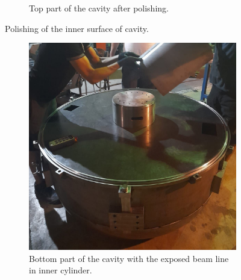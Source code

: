\documentclass{book}
\begin{document}
\begin{figure}
\begin{subfigure}{.5\textwidth}
      \caption{Top part of the cavity after polishing.}
    \end{subfigure}
    \caption{Polishing of the inner surface of cavity.}
    \label{fig:manif_polishing}
\end{figure}


\begin{figure}
    \captionsetup[subfigure]{justification=centering}
    \captionsetup{justification=centering}
    \centering
    \begin{subfigure}{.5\textwidth}
      \centering
      \includegraphics[width=.96\linewidth]{../../../figures/manif/toroidal_sheets/rhodo_bottom_cropped.jpeg}
      \caption{Bottom part of the cavity with the exposed beam line in inner cylinder.}
    \end{subfigure}%
    \centering
    \begin{subfigure}{.5\textwidth}
      \centering

\end{subfigure}
\end{figure}
\end{document}

